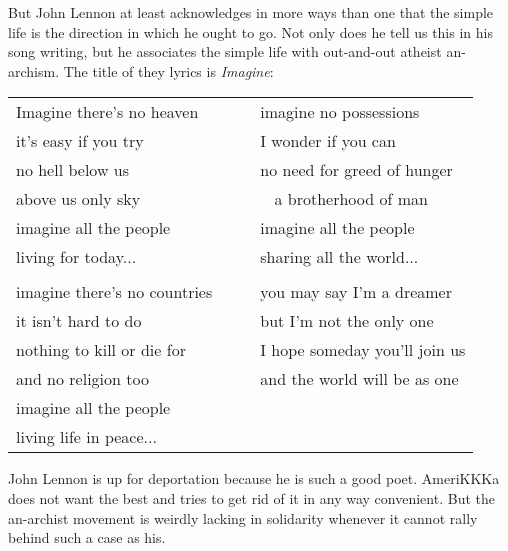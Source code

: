 \documentclass[12pt, onecolumn, letterpaper, oneside]{book}
\begin{document}
But John Lennon at least acknowledges in more ways than one that the simple life is the direction in which he ought to go. Not only does he tell us this in his song writing, but he associates the simple life with out-and-out atheist an-archism. The title of they lyrics is \emph{Imagine}: 
\begin{center}
\begin{tabular}{l l l l}
Imagine there's no heaven & & &  imagine no possessions\\
it's easy if you try & & & I wonder if you can\\
no hell below us & & &  no need for greed of hunger\\
above us only sky & & &  $\;\;$ a brotherhood of man\\
imagine all the people & & &  imagine all the people\\
living for today... & & & sharing all the world...\\
\\
imagine there's no countries & & & you may say I'm a dreamer\\
it isn't hard to do & & & but I'm not the only one\\
nothing to kill or die for & & & I hope someday you'll join us\\
and no religion too & & & and the world will be as one\\
imagine all the people\\
living life in peace...
\end{tabular}
\end{center}
John Lennon is up for deportation because he is such a good poet. AmeriKKKa does not want the best and tries to get rid of it in any way convenient. But the an-archist movement is weirdly lacking in solidarity whenever it cannot rally behind such a case as his.
\end{document}
